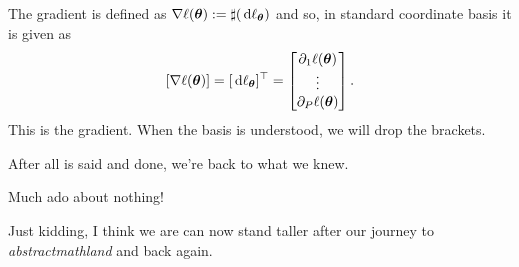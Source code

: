 \documentclass[12pt]{amsart}
\begin{document}
The gradient is defined as $\nabla\ell(\mathbf{\boldsymbol{\theta}}) := \sharp (\,\mathrm{d} \ell_{\mathbf{\boldsymbol{\theta}}})$ and so, in standard coordinate basis it is given as
\[
	[\nabla \ell (\mathbf{\boldsymbol{\theta}}) ] = [\,\mathrm{d} \ell_{\mathbf{\boldsymbol{\theta}}}]^\top =  \begin{bmatrix}
	\partial_1 \ell(\mathbf{\boldsymbol{\theta}}) \\ 
	\vdots\\
	\partial_P \ell(\mathbf{\boldsymbol{\theta}})
	\end{bmatrix}.
\]
This is the gradient. When the basis is understood, we will drop the brackets. 

\noindent\hrulefill

After all is said and done, we're back to what we knew.

\medskip
Much ado about nothing! 

\medskip
Just kidding, I think we are can now stand taller after our journey to \emph{abstractmathland} and back again.
\end{document}
